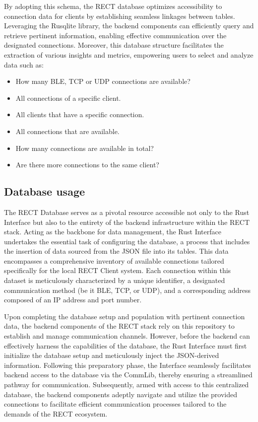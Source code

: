 By adopting this schema, the RECT database optimizes accessibility to connection data for clients by establishing seamless linkages between tables. Leveraging the Rusqlite
library, the backend components can efficiently query and retrieve pertinent information, enabling effective communication over the designated connections. Moreover, this 
database structure facilitates the extraction of various insights and metrics, empowering users to select and analyze data such as:

\begin{itemize}
  \item[] How many BLE, TCP or UDP connections are available?
  \item[] All connections of a specific client.
  \item[] All clients that have a specific connection.
  \item[] All connections that are available.
  \item[] How many connections are available in total?
  \item[] Are there more connections to the same client?
\end{itemize}

\subsection{Database usage}

The RECT Database serves as a pivotal resource accessible not only to the Rust Interface but also to the entirety of the backend infrastructure within the RECT stack. 
Acting as the backbone for data management, the Rust Interface undertakes the essential task of configuring the database, a process that includes the insertion of data 
sourced from the JSON file into its tables. This data encompasses a comprehensive inventory of available connections tailored specifically for the local RECT Client system.
Each connection within this dataset is meticulously characterized by a unique identifier, a designated communication method (be it BLE, TCP, or UDP), and a corresponding 
address composed of an IP address and port number.\newline

Upon completing the database setup and population with pertinent connection data, the backend components of the RECT stack rely on this repository to establish and manage 
communication channels. However, before the backend can effectively harness the capabilities of the database, the Rust Interface must first initialize the database setup 
and meticulously inject the JSON-derived information. Following this preparatory phase, the Interface seamlessly facilitates backend access to the database via the CommLib,
thereby ensuring a streamlined pathway for communication. Subsequently, armed with access to this centralized database, the backend components adeptly navigate and utilize
the provided connections to facilitate efficient communication processes tailored to the demands of the RECT ecosystem.

